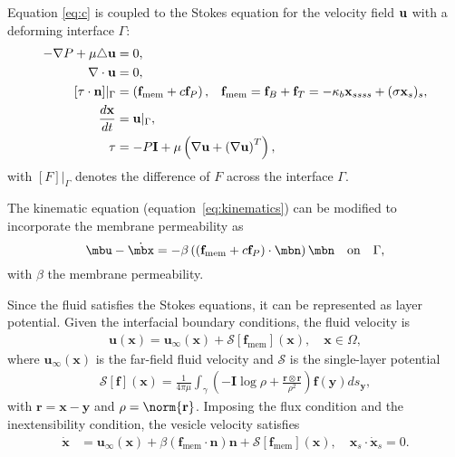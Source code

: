 \documentclass[11pt]{article}
\newcommand{\ff}{\mathbf{f}}
\newcommand{\nn}{\mathbf{n}}
\newcommand{\uu}{\mathbf{u}}
\newcommand{\xx}{\mathbf{x}}
\newcommand{\rr}{\mathbf{r}}
\renewcommand{\SS}{\mathcal{S}}
\newcommand{\yy}{\mathbf{y}}
\begin{document}
%
Equation \ref{eq:c} is coupled to the Stokes equation for the velocity field ${\bf u}$ with a deforming interface $\Gamma$:
\begin{align}
-\nabla P + \mu \triangle {\bf u} &=0,\\
\nabla\cdot{\bf u} & =0,\\
 \left[ \tau\cdot{\bf n}\right]\rvert_{\Gamma} &= \left({\bf f}_{\text{mem}} + c {\bf f}_P\right),\;\;\; \ff_{\text{mem}} = \ff_B + \ff_T = -\kappa_b \xx_{ssss} + (\sigma \xx_s)_s, \\
\label{eq:kinematics}
\frac{d{\bf x}}{dt} &= {\bf u}\rvert_{\Gamma},\\
\tau &= -P {\bf I} + \mu\left(\nabla {\bf u} + \left(\nabla {\bf u}\right)^T\right),
\end{align}
with $\left[F\right]\rvert_{\Gamma}$ denotes the difference of $F$ across the interface $\Gamma$.

The kinematic equation (equation~\ref{eq:kinematics}) can be modified to incorporate the membrane permeability as
\begin{equation}
 \mbu - \dot{\mbx} = - \beta \left(\left(\ff_\text{mem} + c {\bf f}_P \right)\cdot \mbn\right) \mbn \quad\text{on}\quad\Gamma,
 \end{equation}
with $\beta$ the membrane permeability.

Since the fluid satisfies the Stokes equations, it can be represented as
layer potential. Given the interfacial boundary
conditions, the fluid velocity is
\begin{align}
  \uu(\xx) = \uu_\infty(\xx) + \SS[\ff_\mathrm{mem}](\xx), \quad
    \xx \in \Omega,
\end{align}
where $\uu_\infty(\xx)$ is the far-field fluid velocity and $\SS$ is the single-layer potential
\begin{align}
  \SS[\ff](\xx) = \frac{1}{4\pi\mu} \int_{\gamma} \left(
    -\mathbf{I} \log\rho + \frac{\rr \otimes \rr}{\rho^2} \right)
    \ff(\yy) ds_{\yy},
\end{align}
with $\rr = \xx - \yy$ and $\rho = \norm{\rr}$. Imposing the flux
condition and the inextensibility condition, the
vesicle velocity satisfies
\begin{align}
  \label{eqn:vesVelocity}
  \dot{\xx} &= \uu_\infty(\xx) + \beta (\ff_\mathrm{mem}\cdot\nn)\nn
  + \SS [\ff_\mathrm{mem}](\xx),  \quad
  \xx_s \cdot \dot{\xx}_s = 0.
\end{align}
\end{document}
